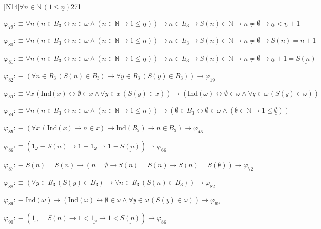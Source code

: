 \begin{fullproof}{[N14]}{$\forall n \in \mathbb{N}\,(1 \leq \underline{n})$}{271}
\begin{abbrevlist}
\item $\varphi_{79} :\equiv \forall n\,(n \in B_{3} \leftrightarrow n \in \omega \land (n \in \mathbb{N} \to 1 \leq \underline{n})) \to n \in B_{3} \to S(n) \in \mathbb{N} \to n \neq \emptyset \to \underline{n} < \underline{n} + 1$
\item $\varphi_{80} :\equiv \forall n\,(n \in B_{3} \leftrightarrow n \in \omega \land (n \in \mathbb{N} \to 1 \leq \underline{n})) \to n \in B_{3} \to S(n) \in \mathbb{N} \to n \neq \emptyset \to \underline{S(n)} = \underline{n} + 1$
\item $\varphi_{81} :\equiv \forall n\,(n \in B_{3} \leftrightarrow n \in \omega \land (n \in \mathbb{N} \to 1 \leq \underline{n})) \to n \in B_{3} \to S(n) \in \mathbb{N} \to n \neq \emptyset \to \underline{n} + 1 = \underline{S(n)}$
\item $\varphi_{82} :\equiv (\forall n \in B_{3}\,(S(n) \in B_{3}) \to \forall y \in B_{3}\,(S(y) \in B_{3})) \to \varphi_{19}$
\item $\varphi_{83} :\equiv \forall x\,(\mathrm{Ind}(x) \leftrightarrow \emptyset \in x \land \forall y \in x\,(S(y) \in x)) \to (\mathrm{Ind}(\omega) \leftrightarrow \emptyset \in \omega \land \forall y \in \omega\,(S(y) \in \omega))$
\item $\varphi_{84} :\equiv \forall n\,(n \in B_{3} \leftrightarrow n \in \omega \land (n \in \mathbb{N} \to 1 \leq \underline{n})) \to (\emptyset \in B_{3} \leftrightarrow \emptyset \in \omega \land (\emptyset \in \mathbb{N} \to 1 \leq \underline{\emptyset}))$
\item $\varphi_{85} :\equiv (\forall x\,(\mathrm{Ind}(x) \to n \in x) \to \mathrm{Ind}(B_{3}) \to n \in B_{3}) \to \varphi_{43}$
\item $\varphi_{86} :\equiv (1_{\omega} = S(n) \to 1 = \underline{1_{\omega}} \to 1 = \underline{S(n)}) \to \varphi_{66}$
\item $\varphi_{87} :\equiv S(n) = S(n) \to (n = \emptyset \to S(n) = S(n) \to S(n) = S(\emptyset)) \to \varphi_{72}$
\item $\varphi_{88} :\equiv (\forall y \in B_{3}\,(S(y) \in B_{3}) \to \forall n \in B_{3}\,(S(n) \in B_{3})) \to \varphi_{82}$
\item $\varphi_{89} :\equiv \mathrm{Ind}(\omega) \to (\mathrm{Ind}(\omega) \leftrightarrow \emptyset \in \omega \land \forall y \in \omega\,(S(y) \in \omega)) \to \varphi_{69}$
\item $\varphi_{90} :\equiv (1_{\omega} = S(n) \to 1 < \underline{1_{\omega}} \to 1 < \underline{S(n)}) \to \varphi_{86}$

\end{abbrevlist}
\end{fullproof}
